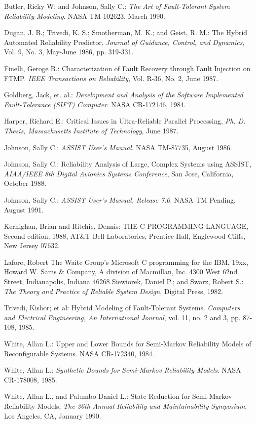 \begin{thebibliography}{25}
 Butler, Ricky W; and Johnson, Sally C.: {\em The Art of
Fault-Tolerant System Reliability Modeling}.  NASA TM-102623, March 1990.


 Dugan, J. B.; Trivedi, K. S.; Smotherman, M. K.; and Geist,
R. M.: The Hybrid Automated Reliability Predictor, {\em Journal of
Guidance, Control, and Dynamics}, Vol. 9, No. 3, May-June 1986, pp. 319-331.


 Finelli, Geroge B.:
Characterization of Fault Recovery through Fault Injection on FTMP.
{\em IEEE Transactions on Reliability}, Vol. R-36, No. 2, June 1987.


 Goldberg, Jack, et. al.: {\em Development and Analysis of the
Software Implemented Fault-Tolerance (SIFT) Computer}. NASA CR-172146, 1984.


 Harper, Richard E.:
Critical Issues in Ultra-Reliable Parallel Processing,
{\em Ph. D. Thesis, Massachusetts Institute of Technology}, June 1987.


 Johnson, Sally C.: {\em ASSIST User's Manual}. NASA
TM-87735, August 1986.

 Johnson, Sally C.: Reliability Analysis of Large, Complex
Systems using ASSIST, {\em AIAA/IEEE 8th Digital Avionics Systems Conference},
San Jose, California, October 1988.


 Johnson, Sally C.:
{\em ASSIST User's Manual, Release 7.0}. NASA TM Pending, August 1991.

 Kerhighan, Brian and Ritchie, Dennis:
THE C PROGRAMMING LANGUAGE,
Second edition,
1988,
AT\&T Bell Laboratories,
Prentice Hall,
Englewood Cliffs, New Jersey 07632.

 Lafore, Robert
The Waite Group's Microsoft C programming for the IBM,
19xx,
Howard W. Sams \& Company,
A division of Macmillan, Inc.
4300 West 62nd Street,
Indianapolis, Indiana 46268
 Siewiorek, Daniel P.; and Swarz, Robert S.:
{\em The Theory and Practice of Reliable System Design}, Digital Press, 1982.

 Trivedi, Kishor; et al: Hybrid Modeling of Fault-Tolerant
Systems.  {\em Computers and Electrical Engineering, An International Journal},
vol. 11, no. 2 and 3, pp. 87-108, 1985.

 White, Allan L.:
Upper and Lower Bounds for Semi-Markov Reliability
Models of Reconfigurable Systems.  NASA CR-172340, 1984.

 White, Allan L.: {\em Synthetic Bounds for Semi-Markov 
Reliability Models}. NASA CR-178008, 1985.

 White, Allan L., and Palumbo Daniel L.: State Reduction
for Semi-Markov Reliability Models, {\em The 36th Annual Reliability and 
Maintainability Symposium}, Los Angeles, CA, January 1990.

\end{thebibliography} 


